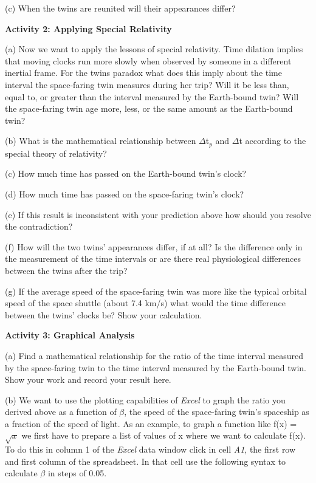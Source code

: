 (c) When the twins are reunited will their appearances differ?
\vspace{15mm}

\textbf{Activity 2: Applying Special Relativity}

(a) Now we want to apply the lessons of special relativity. Time dilation
implies that moving clocks run more slowly when observed by someone
in a different inertial frame. For the twins paradox what does this
imply about the time interval the space-faring twin measures during
her trip? Will it be less than, equal to, or greater than the interval
measured by the Earth-bound twin? Will the space-faring twin age more,
less, or the same amount as the Earth-bound twin?
\vspace{25mm}

(b) What is the mathematical relationship between \( \Delta  \)t\( _{p} \)
and \( \Delta  \)t according to the special theory of relativity?
\vspace{20mm}

(c) How much time has passed on the Earth-bound twin's clock?
\vspace{20mm}

(d) How much time has passed on the space-faring twin's clock?
\vspace{20mm}

(e) If this result is inconsistent with your prediction above how
should you resolve the contradiction?
\vspace{20mm}

(f) How will the two twins' appearances differ, if at all? Is the
difference only in the measurement of the time intervals or are there
real physiological differences between the twins after the trip?
\vspace{20mm}

(g) If the average speed of the space-faring twin was more like the
typical orbital speed of the space shuttle (about 7.4 km/s) what would
the time difference between the twins' clocks be? Show your calculation.
\vspace{45mm}

\textbf{Activity 3: Graphical Analysis}

(a) Find a mathematical relationship for the ratio of the time interval
measured by the space-faring twin to the time interval measured by
the Earth-bound twin. Show your work and record your result here.
\vspace{45mm}

(b) We want to use the plotting capabilities of \emph{Excel}
to graph the ratio you derived above as a function of \( \beta  \),
the speed of the space-faring twin's spaceship as a fraction of the
speed of light. As an example, to graph a function like f(x) = \( \sqrt{x} \)
we first have to prepare a list of values of x where we want to calculate
f(x). To do this in column 1 of the \emph{Excel} data window
click in cell {\it A1}, the first row and first column of the spreadsheet.
In that cell use the following syntax to calculate
\( \beta  \) in steps of 0.05.

